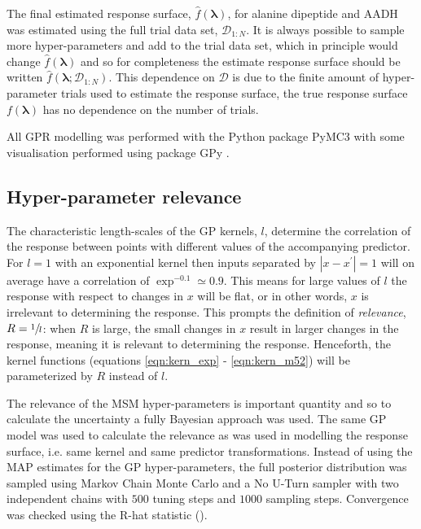 The final estimated response surface, $\hat{f}(\mathbf{\lambda})$, for alanine dipeptide and AADH was estimated using the full trial data set, $\mathcal{D}_{1:N}$. It is always possible to sample more hyper-parameters and add to the trial data set, which in principle would change $\hat{f}(\mathbf{\lambda})$ and so for completeness the estimate response surface should be written $\hat{f}(\mathbf{\lambda}; \mathcal{D}_{1:N})$. This dependence on $\mathcal{D}$ is due to the finite amount of hyper-parameter trials used to estimate the response surface, the true response surface $f(\mathbf{\lambda})$ has no dependence on the number of trials. 

All GPR modelling was performed with the Python package PyMC3 \cite{salvatierProbabilisticProgrammingPython2016} with some visualisation performed using package GPy \cite{gpy2014}. 

\subsection{Hyper-parameter relevance}
The characteristic length-scales of the GP kernels, $l$, determine the correlation of the response between points with different values of the accompanying predictor. For $l=1$ with an exponential kernel then inputs separated by $|x-x^{\prime}|= 1$ will on average have a correlation of $\exp^{-0.1}\simeq 0.9$. This means for large values of $l$ the response with respect to changes in $x$ will be flat, or in other words, $x$ is irrelevant to determining the response. This prompts the definition of \emph{relevance}, $R = \sfrac{1}{l}$: when $R$ is large, the small changes in $x$ result in larger changes in the response, meaning it is relevant to determining the response. Henceforth, the kernel functions (equations \ref{eqn:kern_exp} - \ref{eqn:kern_m52}) will be parameterized by $R$ instead of $l$. 

The relevance of the MSM hyper-parameters is important quantity and so to calculate the uncertainty a fully Bayesian approach was used. The same GP model was used to calculate the relevance as was used in modelling the response surface, i.e. same kernel and same predictor transformations. Instead of using the MAP estimates for the GP hyper-parameters, the full posterior distribution was sampled using Markov Chain Monte Carlo and a No U-Turn sampler with two independent chains with $500$ tuning steps and $1000$ sampling steps. Convergence was checked using the R-hat statistic (\cite{gelmanBayesianDataAnalysis2014}). 


